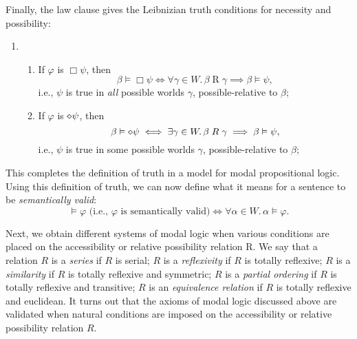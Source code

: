 \documentclass[
  12pt,
  letterpaper,
  DIV=11,
  numbers=noendperiod,
  twoside]{scrreprt}
\theoremstyle{remark}
\begin{document}
Finally, the law clause gives the Leibnizian truth conditions for
necessity and possibility:

\begin{enumerate}
\def\labelenumi{(\arabic{enumi})}
\setcounter{enumi}{6}
\item
  \begin{enumerate}
  \def\labelenumii{(\alph{enumii})}
  \item
    If \(\varphi\) is \(\Box\psi\), then \[
    \beta\vDash \Box\psi \iff \forall \gamma\in W.\, \beta\mathrel{R}\gamma \implies \beta\vDash\psi,
    \] i.e., \(\psi\) is true in \emph{all} possible worlds \(\gamma\),
    possible-relative to \(\beta\);
  \item
    If \(\varphi\) is \({\Large\diamond}\psi\), then \[
    \beta\vDash {\Large\diamond}\psi \iff \exists \gamma\in W.\, \beta\mathrel{R}\gamma \implies \beta\vDash\psi,
    \] i.e., \(\psi\) is true in some possible worlds \(\gamma\),
    possible-relative to \(\beta\);
  \end{enumerate}
\end{enumerate}

This completes the definition of truth in a model for modal
propositional logic. Using this definition of truth, we can now define
what it means for a sentence to be \emph{semantically valid}: \[
\vDash\varphi\text{ (i.e., }\varphi\text{ is semantically valid)} \iff \forall\alpha\in W.\, \alpha\vDash\varphi.
\]

Next, we obtain different systems of modal logic when various conditions
are placed on the accessibility or relative possibility relation R. We
say that a relation \(R\) is a \emph{series} if \(R\) is serial; \(R\)
is a \emph{reflexivity} if \(R\) is totally reflexive; \(R\) is a
\emph{similarity} if \(R\) is totally reflexive and symmetric; \(R\) is
a \emph{partial ordering} if \(R\) is totally reflexive and transitive;
\(R\) is an \emph{equivalence relation} if \(R\) is totally reflexive
and euclidean. It turns out that the axioms of modal logic discussed
above are validated when natural conditions are imposed on the
accessibility or relative possibility relation \(R\).
\end{document}
